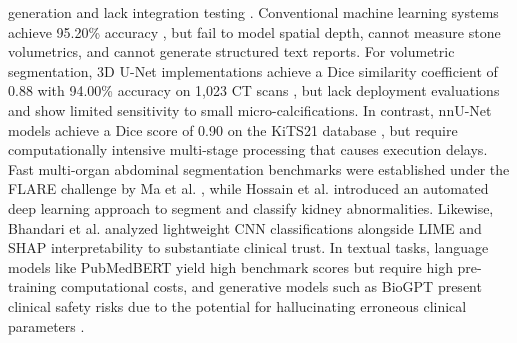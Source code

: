 \documentclass[]{elsarticle}
\begin{document}
generation and lack integration testing \cite{verma23}. Conventional machine learning systems achieve 95.20\% accuracy \cite{rajendran2025kidney}, but fail to model spatial depth, cannot measure stone volumetrics, and cannot generate structured text reports. For volumetric segmentation, 3D U-Net implementations achieve a Dice similarity coefficient of 0.88 with 94.00\% accuracy on 1,023 CT scans \cite{elton2022deep}, but lack deployment evaluations and show limited sensitivity to small micro-calcifications. In contrast, nnU-Net models achieve a Dice score of 0.90 on the KiTS21 database \cite{heller2023kits21}, but require computationally intensive multi-stage processing that causes execution delays. Fast multi-organ abdominal segmentation benchmarks were established under the FLARE challenge by Ma et al. \cite{ma2022fast}, while Hossain et al. \cite{hossain2025detection} introduced an automated deep learning approach to segment and classify kidney abnormalities. Likewise, Bhandari et al. \cite{bhandari2023exploring} analyzed lightweight CNN classifications alongside LIME and SHAP interpretability to substantiate clinical trust. In textual tasks, language models like PubMedBERT yield high benchmark scores but require high pre-training computational costs, and generative models such as BioGPT present clinical safety risks due to the potential for hallucinating erroneous clinical parameters \cite{kumar2024comprehensive, holzinger2019causability, sharma22, gu2021domain, fang2023bioformer, luo2022biogpt}.
\end{document}
